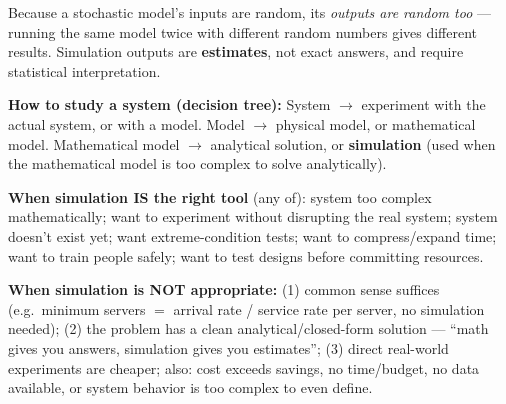 \begin{keypoint}
Because a stochastic model's inputs are random, its \emph{outputs are random too} — running the same model twice with different random numbers gives different results. Simulation outputs are \textbf{estimates}, not exact answers, and require statistical interpretation.
\end{keypoint}

\textbf{How to study a system (decision tree):} System $\to$ experiment with the actual system, or with a model. Model $\to$ physical model, or mathematical model. Mathematical model $\to$ analytical solution, or \textbf{simulation} (used when the mathematical model is too complex to solve analytically).

\textbf{When simulation IS the right tool} (any of): system too complex mathematically; want to experiment without disrupting the real system; system doesn't exist yet; want extreme-condition tests; want to compress/expand time; want to train people safely; want to test designs before committing resources.

\textbf{When simulation is NOT appropriate:} (1) common sense suffices (e.g.\ minimum servers $=$ arrival rate / service rate per server, no simulation needed); (2) the problem has a clean analytical/closed-form solution — ``math gives you answers, simulation gives you estimates''; (3) direct real-world experiments are cheaper; also: cost exceeds savings, no time/budget, no data available, or system behavior is too complex to even define.

